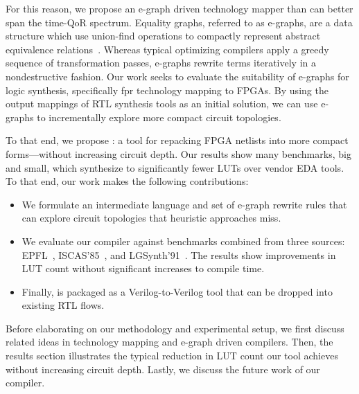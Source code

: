 For this reason, we propose an e-graph driven technology mapper than can better
span the time-QoR spectrum. Equality graphs, referred to as e-graphs, are a
data structure which use union-find operations to compactly represent abstract
equivalence relations~\cite{eggpaper}. Whereas typical optimizing compilers
apply a greedy sequence of transformation passes, e-graphs rewrite terms
iteratively in a nondestructive fashion. Our work seeks to evaluate the
suitability of e-graphs for logic synthesis, specifically fpr technology
mapping to FPGAs. By using the output mappings of RTL synthesis tools as an
initial solution, we can use e-graphs to incrementally explore more compact
circuit topologies.

To that end, we propose \shortname{}: a tool for repacking FPGA netlists into
more compact forms---without increasing circuit depth. Our results show many
benchmarks, big and small, which synthesize to significantly fewer LUTs over
vendor EDA tools. To that end, our work makes the following contributions:

\begin{itemize}
    \item We formulate an intermediate language and set of e-graph rewrite rules that can
          explore circuit topologies that heuristic approaches miss.
    \item We evaluate our compiler against \nbenchmarks{} benchmarks combined from three
          sources: EPFL~\cite{epflbench}, ISCAS'85~\cite{iscasbench}, and
          LGSynth'91~\cite{lgsynthbench}. The results show improvements in LUT count
          without significant increases to compile time.
    \item Finally, \shortname{} is packaged as a Verilog-to-Verilog tool that can be
          dropped into existing RTL flows.
\end{itemize}

Before elaborating on our methodology and experimental setup, we first discuss
related ideas in technology mapping and e-graph driven compilers. Then, the
results section illustrates the typical reduction in LUT count our tool
achieves without increasing circuit depth. Lastly, we discuss the future work
of our compiler.
